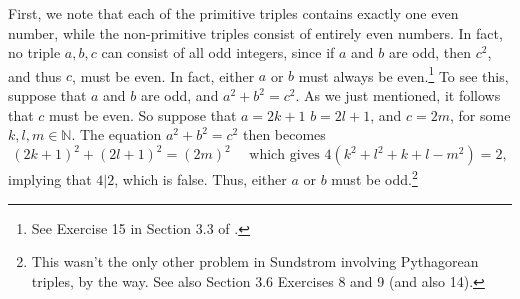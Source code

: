 \documentclass[letterpaper,12pt]{article}
\theoremstyle{definition}
\begin{document}
First, we note that each of the primitive triples contains exactly one even number, while the non-primitive triples consist of entirely even numbers. In fact, no triple $a,b,c$ can consist of all odd integers, since if $a$ and $b$ are odd, then $c^2$, and thus $c$, must be even. In fact, either $a$ or $b$ must always be even.\footnote{See Exercise 15 in Section 3.3 of \cite{Su}.} To see this, suppose that $a$ and $b$ are odd, and $a^2+b^2=c^2$. As we just mentioned, it follows that $c$ must be even. So suppose that $a=2k+1$ $b=2l+1$, and $c=2m$, for some $k,l,m\in\mathbb{N}$. The equation $a^2+b^2=c^2$ then becomes
\[
 (2k+1)^2+(2l+1)^2=(2m)^2 \quad \text{ which gives } 4(k^2+l^2+k+l-m^2) = 2,
\]
implying that $4|2$, which is false. Thus, either $a$ or $b$ must be odd.\footnote{This wasn't the only other problem in Sundstrom involving Pythagorean triples, by the way. See also Section 3.6 Exercises 8 and 9 (and also 14).}
\end{document}
